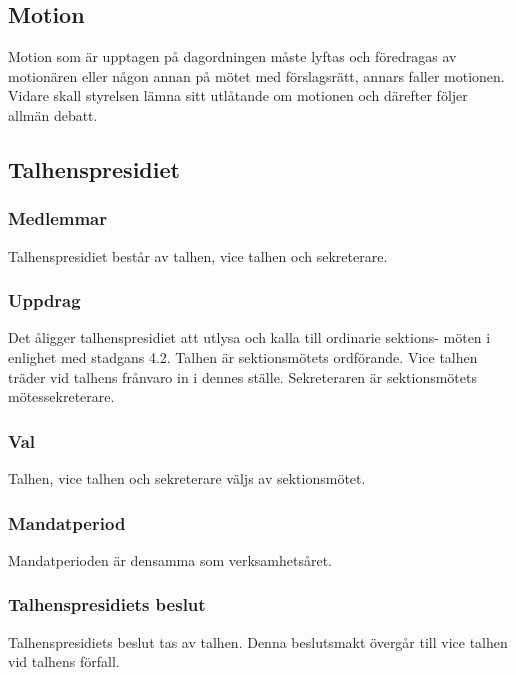 \subsection{Motion} 
Motion som är upptagen på dagordningen måste lyftas och föredragas av motionären eller någon annan på mötet med förslagsrätt, annars faller motionen. Vidare skall styrelsen lämna sitt utlåtande om motionen och därefter följer allmän debatt. 
\subsection{Talhenspresidiet}
\subsubsection{Medlemmar}
Talhenspresidiet består av talhen, vice talhen och sekreterare.
\subsubsection{Uppdrag}
Det åligger talhenspresidiet att utlysa och kalla till ordinarie sektions-
möten i enlighet med stadgans 4.2. Talhen är sektionsmötets ordförande. Vice talhen träder vid talhens frånvaro in i dennes ställe. Sekreteraren är sektionsmötets mötessekreterare.
\subsubsection{Val}
Talhen, vice talhen och sekreterare väljs av sektionsmötet.
\subsubsection{Mandatperiod}
Mandatperioden är densamma som verksamhetsåret.
\subsubsection{Talhenspresidiets beslut}
Talhenspresidiets beslut tas av talhen. Denna beslutsmakt övergår till
vice talhen vid talhens förfall.

\newpage

